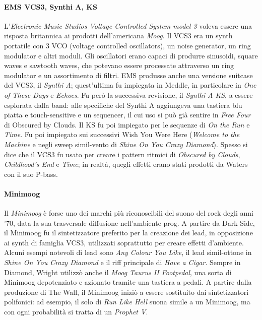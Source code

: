 \documentclass[class=book, crop=false, oneside, 12pt]{standalone}
\begin{document}
    \paragraph{EMS VCS3, Synthi A, KS}
    L'\emph{Electronic Music Studios Voltage Controlled System model 3} voleva essere una risposta britannica ai prodotti dell'americana \emph{Moog}. Il VCS3 era un synth portatile con 3 VCO (voltage controlled oscillators), un noise generator, un ring modulator e altri moduli. Gli oscillatori erano capaci di produrre sinusoidi, square waves e sawtooth waves, che potevano essere processate attraverso un ring modulator e un assortimento di filtri. EMS produsse anche una versione suitcase del VCS3, il \emph{Synthi A}; quest'ultima fu impiegata in Meddle, in particolare in \emph{One of These Days} e \emph{Echoes}. Fu però la successiva revisione, il \emph{Synthi A KS}, a essere esplorata dalla band: alle specifiche del Synthi A aggiungeva una tastiera blu piatta e touch-sensitive e un sequencer, il cui uso si può già sentire in \emph{Free Four} di Obscured by Clouds. Il KS fu poi impiegato per le sequenze di \emph{On the Run} e \emph{Time}. Fu poi impiegato sui successivi Wish You Were Here (\emph{Welcome to the Machine} e negli sweep simil-vento di \emph{Shine On You Crazy Diamond}). Spesso si dice che il VCS3 fu usato per creare i pattern ritmici di \emph{Obscured by Clouds}, \emph{Childhood's End} e \emph{Time}; in realtà, quegli effetti erano stati prodotti da Waters con il suo P-bass.

    \paragraph{Minimoog}
    Il \emph{Minimoog} è forse uno dei marchi più riconoscibili del suono del rock degli anni '70, data la sua trasversale diffusione nell'ambiente prog. A partire da Dark Side, il Minimoog fu il sintetizzatore preferito per la creazione dei lead, in opposizione ai synth di famiglia VCS3, utilizzati soprattutto per creare effetti d'ambiente. Alcuni esempi notevoli di lead sono \emph{Any Colour You Like}, il lead simil-ottone in \emph{Shine On You Crazy Diamond} e il riff principale di \emph{Have a Cigar}. Sempre in Diamond, Wright utilizzò anche il \emph{Moog Taurus II Footpedal}, una sorta di Minimoog depotenziato  e azionato tramite una tastiera a pedali. A partire dalla produzione di The Wall, il Minimoog iniziò a essere sostituito dai sintetizzatori polifonici: ad esempio, il solo di \emph{Run Like Hell} suona simile a un Minimoog, ma con ogni probabilità si tratta di un \emph{Prophet V}.
\end{document}
